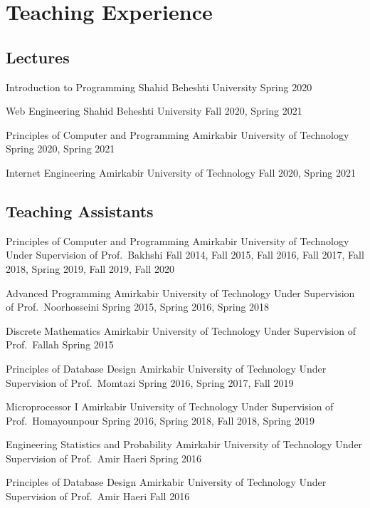 \section{Teaching Experience}

\subsection{Lectures}
\cventry{}
  {Introduction to Programming}
  {}
  {Shahid Beheshti University}
  {}
  {Spring 2020}

\cventry{}
  {Web Engineering}
  {}
  {Shahid Beheshti University}
  {}
  {Fall 2020, Spring 2021}

\cventry{}
  {Principles of Computer and Programming}
  {}
  {Amirkabir University of Technology}
  {}
  {Spring 2020, Spring 2021}

\cventry{}
  {Internet Engineering}
  {}
  {Amirkabir University of Technology}
  {}
  {Fall 2020, Spring 2021}

\subsection{Teaching Assistants}

\cventry{}
  {Principles of Computer and Programming}
  {}
  {Amirkabir University of Technology}
  {Under Supervision of Prof.\ Bakhshi}
  {Fall 2014, Fall 2015, Fall 2016, Fall 2017, Fall 2018, Spring 2019, Fall 2019, Fall 2020}

\cventry{}
  {Advanced Programming}
  {}
  {Amirkabir University of Technology}
  {Under Supervision of Prof.\ Noorhosseini}
  {Spring 2015, Spring 2016, Spring 2018}

\cventry{}
  {Discrete Mathematics}
  {}
  {Amirkabir University of Technology}
  {Under Supervision of Prof.\ Fallah}
  {Spring 2015}

\cventry{}
  {Principles of Database Design}
  {}
  {Amirkabir University of Technology}
  {Under Supervision of Prof.\ Momtazi}
  {Spring 2016, Spring 2017, Fall 2019}

\cventry{}
  {Microprocessor I}
  {}
  {Amirkabir University of Technology}
  {Under Supervision of Prof.\ Homayounpour}
  {Spring 2016, Spring 2018, Fall 2018, Spring 2019}

\cventry{}
  {Engineering Statistics and Probability}
  {}
  {Amirkabir University of Technology}
  {Under Supervision of Prof.\ Amir Haeri}
  {Spring 2016}

\cventry{}
  {Principles of Database Design}
  {}
  {Amirkabir University of Technology}
  {Under Supervision of Prof.\ Amir Haeri}
  {Fall 2016}

